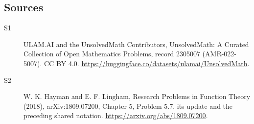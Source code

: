 \documentclass[11pt]{article}
\begin{document}
\subsection{Sources}
\begin{description}
\item[\hypertarget{source:2305007:1}{S1}] ULAM.AI and the UnsolvedMath Contributors, UnsolvedMath: A Curated Collection of Open Mathematics Problems, record 2305007 (AMR-022-5007). CC BY 4.0. \url{https://huggingface.co/datasets/ulamai/UnsolvedMath}.
\item[\hypertarget{source:2305007:2}{S2}] W. K. Hayman and E. F. Lingham, Research Problems in Function Theory (2018), arXiv:1809.07200, Chapter 5, Problem 5.7, its update and the preceding shared notation. \url{https://arxiv.org/abs/1809.07200}.
\end{description}
\label{end:2305007}
\end{document}
